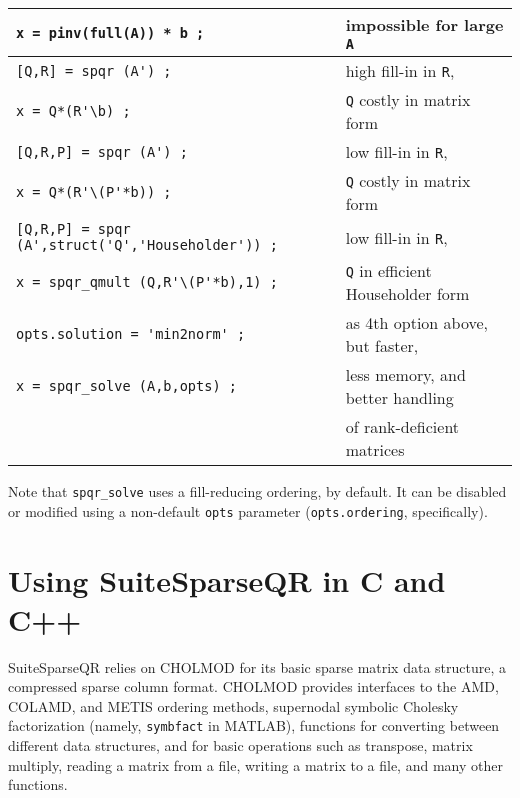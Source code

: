 \documentclass[12pt]{article}
\begin{document}
{\footnotesize
\begin{tabular}{|l|l|}
    \hline
    \verb"x = pinv(full(A)) * b ;"
        & impossible for large \verb'A' \\
    \hline
    \verb"[Q,R] = spqr (A') ;"
        & high fill-in in \verb'R', \\
    \verb"x = Q*(R'\b) ;"
        & \verb'Q' costly in matrix form \\
    \hline
    \verb"[Q,R,P] = spqr (A') ;"
        & low fill-in in \verb'R', \\
    \verb"x = Q*(R'\(P'*b)) ;"
        & \verb'Q' costly in matrix form \\
    \hline
    \verb"[Q,R,P] = spqr (A',struct('Q','Householder')) ;"
        & low fill-in in \verb'R', \\
    \verb"x = spqr_qmult (Q,R'\(P'*b),1) ;"
        & \verb'Q' in efficient Householder form \\
    \hline
    \verb"opts.solution = 'min2norm' ;"
        & as 4th option above, but faster, \\
    \verb"x = spqr_solve (A,b,opts) ;"
        & less memory, and better handling \\
        & of rank-deficient matrices \\
    \hline
\end{tabular}
}

Note that \verb'spqr_solve' uses a fill-reducing ordering, by default.
It can be disabled or modified using a non-default \verb'opts' parameter
(\verb'opts.ordering', specifically).

\section{Using SuiteSparseQR in C and C++}

SuiteSparseQR relies on CHOLMOD for its basic sparse matrix data structure, a
compressed sparse column format.  CHOLMOD provides interfaces to the AMD,
COLAMD, and METIS ordering methods, supernodal symbolic Cholesky factorization
(namely, \verb'symbfact' in MATLAB), functions for converting between different
data structures, and for basic operations such as transpose, matrix multiply,
reading a matrix from a file, writing a matrix to a file, and many other
functions.

\end{document}
